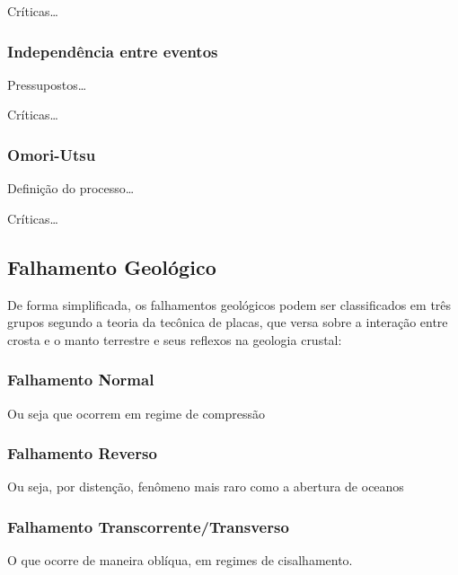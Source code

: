Críticas\ldots


\subsubsection{Independência entre eventos}
\label{sec:risco_sismico}

Pressupostos\ldots

Críticas\ldots


\subsubsection{Omori-Utsu}
\label{sec:risco_sismico}

Definição do processo\ldots

Críticas\ldots


\subsection{Falhamento Geológico}
\label{sec:risco_sismico}

De forma simplificada, os falhamentos geológicos podem ser classificados em três
grupos segundo a teoria da tecônica de placas, que versa sobre a interação
entre crosta e o manto terrestre e seus reflexos na geologia crustal:

\subsubsection{Falhamento Normal}
\label{sec:risco_sismico}

Ou seja que ocorrem em regime de compressão


\subsubsection{Falhamento Reverso}
\label{sec:risco_sismico}

Ou seja, por distenção, fenômeno mais raro como a abertura de oceanos 


\subsubsection{Falhamento Transcorrente/Transverso}
\label{sec:risco_sismico}

O que ocorre de maneira oblíqua, em regimes de cisalhamento.



